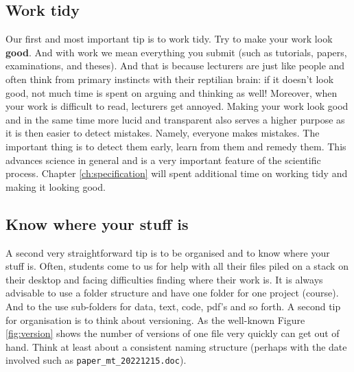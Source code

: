 \documentclass[
]{book}
\begin{document}
\hypertarget{work-tidy}{%
\subsection{Work tidy}\label{work-tidy}}

Our first and most important tip is to work tidy. Try to make your work look \textbf{good}. And with work we mean everything you submit (such as tutorials, papers, examinations, and theses). And that is because lecturers are just like people and often think from primary instincts with their reptilian brain: if it doesn't look good, not much time is spent on arguing and thinking as well! Moreover, when your work is difficult to read, lecturers get annoyed. Making your work look good and in the same time more lucid and transparent also serves a higher purpose as it is then easier to detect mistakes. Namely, everyone makes mistakes. The important thing is to detect them early, learn from them and remedy them. This advances science in general and is a very important feature of the scientific process. Chapter \ref{ch:specification} will spent additional time on working tidy and making it looking good.

\hypertarget{know-where-your-stuff-is}{%
\subsection{Know where your stuff is}\label{know-where-your-stuff-is}}

A second very straightforward tip is to be organised and to know where your stuff is. Often, students come to us for help with all their files piled on a stack on their desktop and facing difficulties finding where their work is. It is always advisable to use a folder structure and have one folder for one project (course). And to the use sub-folders for data, text, code, pdf's and so forth. A second tip for organisation is to think about versioning. As the well-known Figure \ref{fig:version} shows the number of versions of one file very quickly can get out of hand. Think at least about a consistent naming structure (perhaps with the date involved such as \texttt{paper\_mt\_20221215.doc}).
\end{document}
